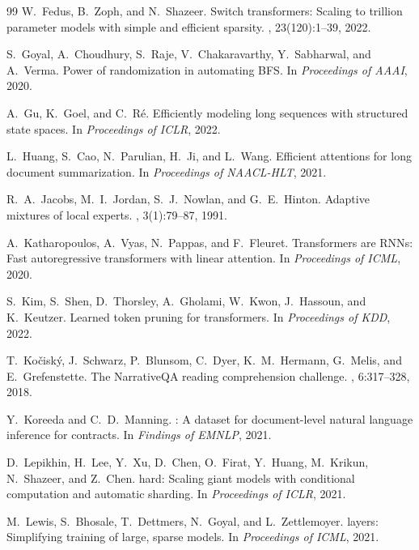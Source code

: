 \documentclass[11pt,a4paper]{article}
\begin{document}
\begin{thebibliography}{99}
W.~Fedus, B.~Zoph, and N.~Shazeer.
\newblock Switch transformers: Scaling to trillion parameter models with simple
  and efficient sparsity.
, 23(120):1--39, 2022.

S.~Goyal, A.~Choudhury, S.~Raje, V.~Chakaravarthy, Y.~Sabharwal, and
  A.~Verma.
\newblock Power of randomization in automating {BFS}.
\newblock In {\em Proceedings of AAAI}, 2020.

A.~Gu, K.~Goel, and C.~R\'{e}.
\newblock Efficiently modeling long sequences with structured state spaces.
\newblock In {\em Proceedings of ICLR}, 2022.

L.~Huang, S.~Cao, N.~Parulian, H.~Ji, and L.~Wang.
\newblock Efficient attentions for long document summarization.
\newblock In {\em Proceedings of NAACL-HLT}, 2021.

R.~A.~Jacobs, M.~I.~Jordan, S.~J.~Nowlan, and G.~E.~Hinton.
\newblock Adaptive mixtures of local experts.
, 3(1):79--87, 1991.

A.~Katharopoulos, A.~Vyas, N.~Pappas, and F.~Fleuret.
\newblock Transformers are {RNN}s: Fast autoregressive transformers with linear
  attention.
\newblock In {\em Proceedings of ICML}, 2020.

S.~Kim, S.~Shen, D.~Thorsley, A.~Gholami, W.~Kwon, J.~Hassoun, and
  K.~Keutzer.
\newblock Learned token pruning for transformers.
\newblock In {\em Proceedings of KDD}, 2022.

T.~Ko\v{c}isk\'{y}, J.~Schwarz, P.~Blunsom, C.~Dyer, K.~M.~Hermann,
  G.~Melis, and E.~Grefenstette.
\newblock The {N}arrative{QA} reading comprehension challenge.
, 6:317--328, 2018.

Y.~Koreeda and C.~D.~Manning.
: A dataset for document-level natural language inference
  for contracts.
\newblock In {\em Findings of EMNLP}, 2021.

D.~Lepikhin, H.~Lee, Y.~Xu, D.~Chen, O.~Firat, Y.~Huang, M.~Krikun,
  N.~Shazeer, and Z.~Chen.
hard: Scaling giant models with conditional computation and
  automatic sharding.
\newblock In {\em Proceedings of ICLR}, 2021.

M.~Lewis, S.~Bhosale, T.~Dettmers, N.~Goyal, and L.~Zettlemoyer.
 layers: Simplifying training of large, sparse models.
\newblock In {\em Proceedings of ICML}, 2021.


\end{thebibliography}
\end{document}
